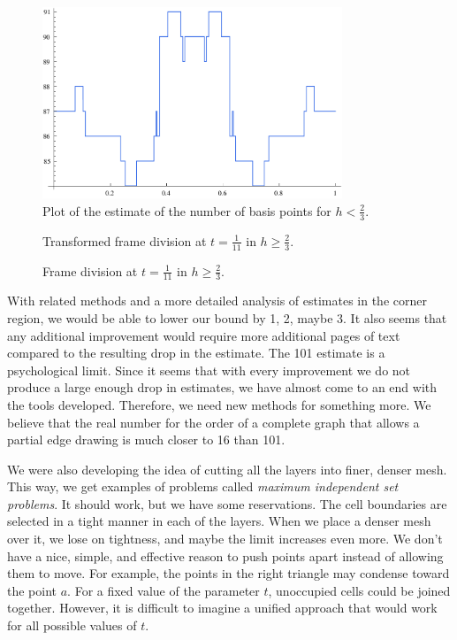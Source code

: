 \begin{figure}
\centering
\includegraphics[width=0.8\textwidth]{./figures/all-together-less-than-two-thirds.pdf}
\caption{Plot of the estimate of the number of basis points for $h < \frac{2}{3}$.}
\label{fig: all-together-less-than-two-thirds}
\end{figure}

\begin{figure}
\centering

\caption{Transformed frame division at $t=\frac{1}{11}$ in $h \geq \frac{2}{3}$.}
\label{fig: coverage-mapped}
\end{figure}

\begin{figure}[t]%
\centering

\caption{Frame division at $t=\frac{1}{11}$ in $h \geq \frac{2}{3}$.}
\label{fig: coverage-final}
\end{figure}

With related methods and a more detailed analysis of estimates in the corner region, we would be able to lower our bound by 1, 2, maybe 3. It also seems that any additional improvement would require more additional pages of text compared to the resulting drop in the estimate. The 101 estimate is a psychological limit. Since it seems that with every improvement we do not produce a large enough drop in estimates, we have almost come to an end with the tools developed. Therefore, we need new methods for something more. We believe that the real number for the order of a complete graph that allows a partial edge drawing is much closer to 16 than 101.

We were also developing the idea of cutting all the layers into finer, denser mesh. This way, we get examples of problems called \textit{maximum independent set problems}. It should work, but we have some reservations. The cell boundaries are selected in a tight manner in each of the layers. When we place a denser mesh over it, we lose on tightness, and maybe the limit increases even more. We don’t have a nice, simple, and effective reason to push points apart instead of allowing them to move. For example, the points in the right triangle may condense toward the point $a$. For a fixed value of the parameter $t$, unoccupied cells could be joined together. However, it is difficult to imagine a unified approach that would work for all possible values of $t$.

